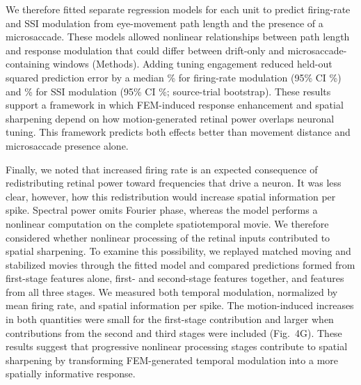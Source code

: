 \documentclass{lite}
\begin{document}
We therefore fitted separate regression models for each unit to predict firing-rate and SSI modulation from eye-movement path length and the presence of a microsaccade. These models allowed nonlinear relationships between path length and response modulation that could differ between drift-only and microsaccade-containing windows (Methods). Adding tuning engagement reduced held-out squared prediction error by a median \FigFourCompareRateReduction\% for firing-rate modulation (95\% CI \FigFourCompareRateCI\%) and \FigFourCompareSSIReduction\% for SSI modulation (95\% CI \FigFourCompareSSICI\%; source-trial bootstrap). These results support a framework in which FEM-induced response enhancement and spatial sharpening depend on how motion-generated retinal power overlaps neuronal tuning. This framework predicts both effects better than movement distance and microsaccade presence alone.

Finally, we noted that increased firing rate is an expected consequence of redistributing retinal power toward frequencies that drive a neuron. It was less clear, however, how this redistribution would increase spatial information per spike. Spectral power omits Fourier phase, whereas the model performs a nonlinear computation on the complete spatiotemporal movie. We therefore considered whether nonlinear processing of the retinal inputs contributed to spatial sharpening. To examine this possibility, we replayed matched moving and stabilized movies through the fitted model and compared predictions formed from first-stage features alone, first- and second-stage features together, and features from all three stages. We measured both temporal modulation, normalized by mean firing rate, and spatial information per spike. The motion-induced increases in both quantities were small for the first-stage contribution and larger when contributions from the second and third stages were included (Fig.~4G). These results suggest that progressive nonlinear processing stages contribute to spatial sharpening by transforming FEM-generated temporal modulation into a more spatially informative response.
\end{document}
